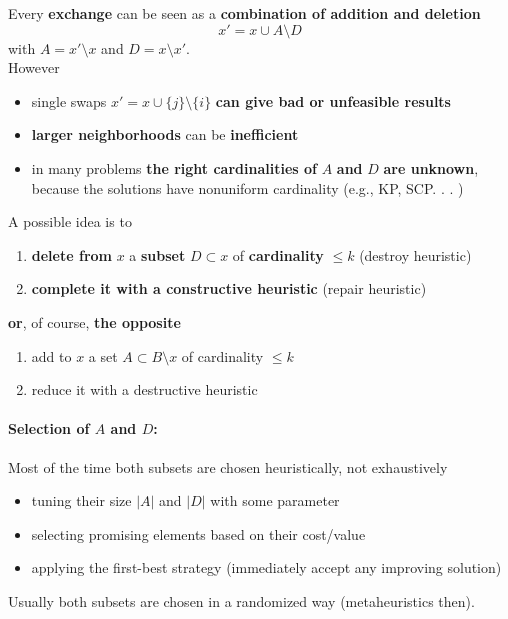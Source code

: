 Every \textbf{exchange} can be seen as a \textbf{combination of addition and deletion}
$$ x' = x \cup A \setminus D $$
with $A = x' \setminus x$ and $D = x \setminus x'$.\\

However
\begin{itemize}
	\item single swaps $x' = x \cup \{j\} \setminus \{i\}$ \textbf{can give bad or unfeasible results}
	
	\item \textbf{larger neighborhoods} can be \textbf{inefficient}
	
	\item in many problems \textbf{the right cardinalities of} $A$ \textbf{and} $D$ \textbf{are unknown}, because the solutions have nonuniform cardinality (e.g., KP, SCP. . . )
\end{itemize}

A possible idea is to
\begin{enumerate}
	\item \textbf{delete from} $x$ a \textbf{subset} $D \subset x$ of \textbf{cardinality} $\leq k$ (destroy heuristic)
	\item \textbf{complete it with a constructive heuristic} (repair heuristic)
\end{enumerate}

\textbf{or}, of course, \textbf{the opposite}
\begin{enumerate}
	\item add to $x$ a set $A \subset B \setminus x$ of cardinality $\leq k$
	\item reduce it with a destructive heuristic
\end{enumerate}

\paragraph{Selection of $A$ and $D$:} Most of the time both subsets are chosen heuristically, not exhaustively
\begin{itemize}
	\item tuning their size $|A|$ and $|D|$ with some parameter
	
	\item selecting promising elements based on their cost/value
	
	\item applying the first-best strategy (immediately accept any improving solution)
\end{itemize}

Usually both subsets are chosen in a randomized way (metaheuristics then). \\


\newpage